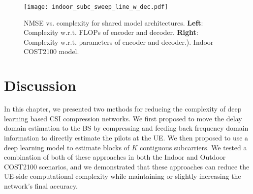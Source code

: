 \begin{figure}[!hbtp]
    \centering
    \texttt{[image: indoor\_subc\_sweep\_line\_w\_dec.pdf]}
    \caption{NMSE vs. complexity for shared model architectures. \textbf{Left}: Complexity w.r.t. FLOPs of encoder and decoder. \textbf{Right}: Complexity w.r.t. parameters of encoder and decoder.). Indoor COST2100 model.}
    \label{fig:indoor_nmse_vs_complexity_w_dec}
\end{figure}

\section{Discussion}

In this chapter, we presented two methods for reducing the complexity of deep learning based CSI compression networks. We first proposed to move the delay domain estimation to the BS by compressing and feeding back frequency domain information to directly estimate the pilots at the UE. We then proposed to use a deep learning model to estimate blocks of $K$ contiguous subcarriers. We tested a combination of both of these approaches in both the Indoor and Outdoor COST2100 scenarios, and we demonstrated that these approaches can reduce the UE-side computational complexity while maintaining or slightly increasing the network's final accuracy.